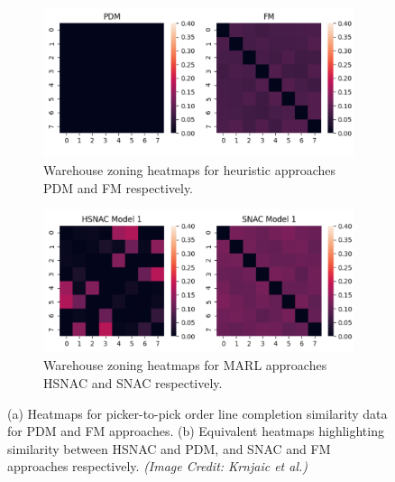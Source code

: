 \documentclass{article}
\begin{document}
\begin{figure}
\centering

\begin{subfigure}[b]{0.55\textwidth}
   \includegraphics[width=1\linewidth]{pdm-fm.png}
   \caption{Warehouse zoning heatmaps for heuristic approaches PDM and FM respectively.}
   \label{fig:pdm-fm}
\end{subfigure}

\begin{subfigure}[b]{0.55\textwidth}
   \includegraphics[width=1\linewidth]{hsnac-snac.png}
   \caption{Warehouse zoning heatmaps for MARL approaches HSNAC and SNAC respectively.}
   \label{fig:hsnac-snac} 
\end{subfigure}


\caption[Warehouse zoning heatmaps]{(a) Heatmaps for picker-to-pick order line completion similarity data for PDM and FM approaches. (b) Equivalent heatmaps highlighting similarity between HSNAC and PDM, and SNAC and FM approaches respectively. \textit{(Image Credit: Krnjaic et al.)}}
\end{figure}
\end{document}
